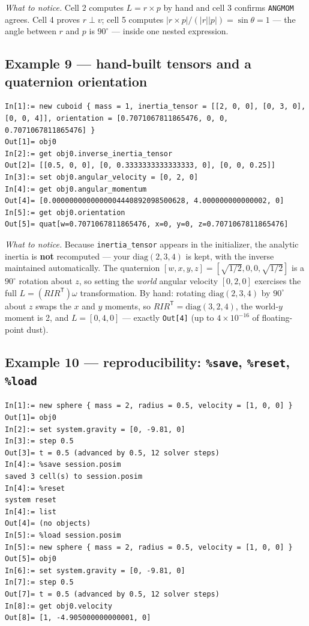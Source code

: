 \documentclass[11pt]{article}
\newcommand{\kw}[1]{\texttt{\uppercase{#1}}}
\newcommand{\code}[1]{\texttt{#1}}
\begin{document}
\emph{What to notice.} Cell 2 computes $L = r\times p$ by hand and cell
3 confirms \kw{angmom} agrees. Cell 4 proves $r\perp v$; cell 5 computes
$|r\times p|/(|r||p|) = \sin\theta = 1$ --- the angle between $r$ and
$p$ is $90^\circ$ --- inside one nested expression.

\subsection{Example 9 --- hand-built tensors and a quaternion orientation}

\begin{lstlisting}
In[1]:= new cuboid { mass = 1, inertia_tensor = [[2, 0, 0], [0, 3, 0], [0, 0, 4]], orientation = [0.7071067811865476, 0, 0, 0.7071067811865476] }
Out[1]= obj0
In[2]:= get obj0.inverse_inertia_tensor
Out[2]= [[0.5, 0, 0], [0, 0.3333333333333333, 0], [0, 0, 0.25]]
In[3]:= set obj0.angular_velocity = [0, 2, 0]
In[4]:= get obj0.angular_momentum
Out[4]= [0.0000000000000004440892098500628, 4.000000000000002, 0]
In[5]:= get obj0.orientation
Out[5]= quat[w=0.7071067811865476, x=0, y=0, z=0.7071067811865476]
\end{lstlisting}

\emph{What to notice.} Because \code{inertia\_tensor} appears in the
initializer, the analytic inertia is \textbf{not} recomputed --- your
$\mathrm{diag}(2,3,4)$ is kept, with the inverse maintained
automatically. The quaternion $[w,x,y,z] = [\sqrt{1/2},0,0,\sqrt{1/2}]$
is a $90^\circ$ rotation about $z$, so setting the \emph{world} angular
velocity $[0,2,0]$ exercises the full $L = (R I R^{\mathsf T})\omega$
transformation. By hand: rotating $\mathrm{diag}(2,3,4)$ by $90^\circ$
about $z$ swaps the $x$ and $y$ moments, so
$R I R^{\mathsf T} = \mathrm{diag}(3,2,4)$, the world-$y$ moment is 2,
and $L = [0, 4, 0]$ --- exactly \code{Out[4]} (up to $4\times10^{-16}$
of floating-point dust).

\subsection{Example 10 --- reproducibility: \code{\%save}, \code{\%reset}, \code{\%load}}

\begin{lstlisting}
In[1]:= new sphere { mass = 2, radius = 0.5, velocity = [1, 0, 0] }
Out[1]= obj0
In[2]:= set system.gravity = [0, -9.81, 0]
In[3]:= step 0.5
Out[3]= t = 0.5 (advanced by 0.5, 12 solver steps)
In[4]:= %save session.posim
saved 3 cell(s) to session.posim
In[4]:= %reset
system reset
In[4]:= list
Out[4]= (no objects)
In[5]:= %load session.posim
In[5]:= new sphere { mass = 2, radius = 0.5, velocity = [1, 0, 0] }
Out[5]= obj0
In[6]:= set system.gravity = [0, -9.81, 0]
In[7]:= step 0.5
Out[7]= t = 0.5 (advanced by 0.5, 12 solver steps)
In[8]:= get obj0.velocity
Out[8]= [1, -4.905000000000001, 0]
\end{lstlisting}
\end{document}
